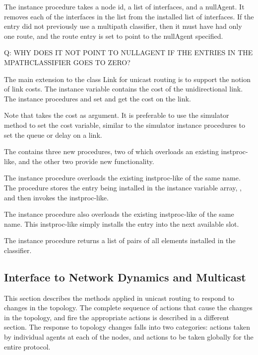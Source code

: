 \begin{list}{---}{}
The instance procedure 
takes a node id, a list of interfaces, and a nullAgent.
It removes each of the interfaces in the list from the installed list of
interfaces.
If the entry did not previously use a multipath classifier,
then it must have had only one route, and the route entry is set to point
to the nullAgent specified.

Q:  WHY DOES IT NOT POINT TO NULLAGENT IF THE ENTRIES IN THE MPATHCLASSIFIER
GOES TO ZERO?

\item   %
  The main extension to the class Link for unicast routing is
  to support the notion of link costs.
  The instance variable 
  contains the cost of the unidirectional link.
  The instance procedures
  and
  set and get the cost on the link.

  Note that  takes the cost as argument.
  It is preferable to use the simulator method to set the cost variable,
  similar to the simulator instance procedures to set the queue or delay
  on a link.
  
\item   %
The 
contains three new procedures, two of which overloads an existing
instproc-like, and the other two provide new functionality.

The instance procedure 
overloads the existing instproc-like of the same name.
The procedure stores the entry being installed in the instance
variable array, , and then invokes the instproc-like.

The instance procedure 
also overloads the existing instproc-like of the same name.
This instproc-like simply installs the entry into the next available slot.

The instance procedure 
returns a list of  pairs of all elements installed in the
classifier.
\end{list}

\subsection{Interface to Network Dynamics and Multicast}
\label{sec:rtglibAPI}
This section describes the methods applied in unicast routing to respond
to changes in the topology.
The complete sequence of actions that cause the changes in the topology,
and fire the appropriate actions is described in a different section.
The response to topology changes falls into two categories:
actions taken by individual agents at each of the nodes, and
actions to be taken globally for the entire protocol.

